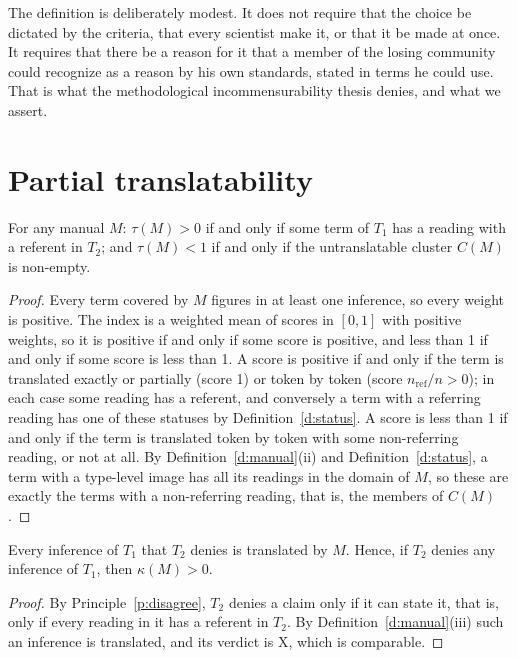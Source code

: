 \documentclass{situationist-preprint}
\begin{document}
The definition is deliberately modest. It does not require that the choice be dictated by the criteria, that every scientist make it, or that it be made at once. It requires that there be a reason for it that a member of the losing community could recognize as a reason by his own standards, stated in terms he could use. That is what the methodological incommensurability thesis denies, and what we assert.

\section{Partial translatability}\label{s:partial}

\begin{lemma}[Bounds]\label{l:bounds}
For any manual $M$: $\tau(M) > 0$ if and only if some term of $T_1$ has a reading with a referent in $T_2$; and $\tau(M) < 1$ if and only if the untranslatable cluster $C(M)$ is non-empty.
\end{lemma}

\begin{proof}
Every term covered by $M$ figures in at least one inference, so every weight is positive. The index is a weighted mean of scores in $[0,1]$ with positive weights, so it is positive if and only if some score is positive, and less than 1 if and only if some score is less than 1. A score is positive if and only if the term is translated exactly or partially (score 1) or token by token (score $n_{\mathrm{ref}}/n > 0$); in each case some reading has a referent, and conversely a term with a referring reading has one of these statuses by Definition~\ref{d:status}. A score is less than 1 if and only if the term is translated token by token with some non-referring reading, or not at all. By Definition~\ref{d:manual}(ii) and Definition~\ref{d:status}, a term with a type-level image has all its readings in the domain of $M$, so these are exactly the terms with a non-referring reading, that is, the members of $C(M)$.
\end{proof}

\begin{lemma}[Disagreement]\label{l:disagree}
Every inference of $T_1$ that $T_2$ denies is translated by $M$. Hence, if $T_2$ denies any inference of $T_1$, then $\kappa(M) > 0$.
\end{lemma}

\begin{proof}
By Principle~\ref{p:disagree}, $T_2$ denies a claim only if it can state it, that is, only if every reading in it has a referent in $T_2$. By Definition~\ref{d:manual}(iii) such an inference is translated, and its verdict is X, which is comparable.
\end{proof}
\end{document}
